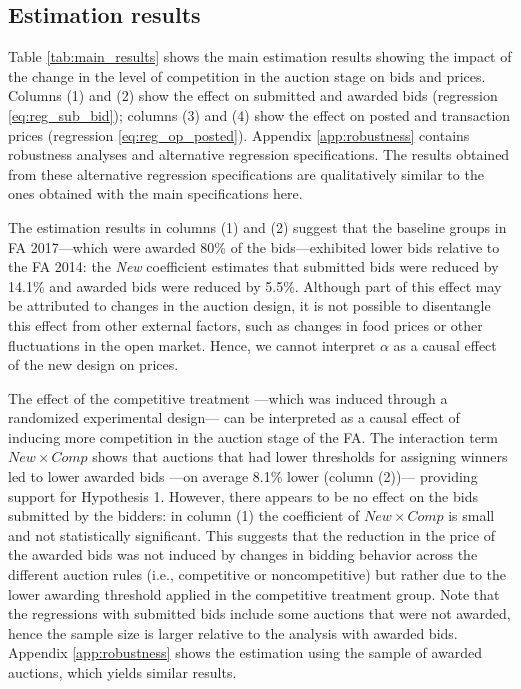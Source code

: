 \subsection{Estimation results}

Table \ref{tab:main_results} shows the main estimation results showing the impact of the change in the level of competition  in the  auction stage on bids and prices. Columns (1) and (2) show the effect on submitted and awarded bids (regression \ref{eq:reg_sub_bid}); columns (3) and (4) show the effect on posted and transaction prices (regression \ref{eq:reg_op_posted}). Appendix \ref{app:robustness} contains robustness analyses and alternative regression specifications. The results obtained from these alternative regression specifications are qualitatively similar to the ones obtained with the main  specifications here.



 The estimation results in columns (1) and (2) suggest that the baseline groups in FA 2017---which were awarded 80\% of the bids---exhibited lower bids relative to the FA 2014: the \textit{New} coefficient estimates that submitted bids were reduced by 14.1\% and awarded bids were reduced by 5.5\%. Although part of this effect may be attributed to changes in the auction design,  it is not possible to disentangle this effect from other external factors, such as changes in food prices or other fluctuations in the open market. Hence, we cannot interpret $\alpha$ as a causal effect of the new design on prices.%
 
 The effect of the competitive treatment ---which was induced through a randomized experimental design--- can be interpreted as a causal effect of inducing more competition in the auction stage of the FA. The interaction term $New\times Comp$ shows that auctions that had lower thresholds for assigning winners led to lower awarded bids ---on average 8.1\% lower (column (2))--- providing support for Hypothesis 1. However, there appears to be no effect on the bids submitted by the bidders: in column (1) the coefficient of $New\times Comp$  is small and not statistically significant. This suggests that the reduction in the price of the awarded bids was not induced by changes in bidding behavior across the different auction rules (i.e., competitive or noncompetitive) but rather due to the lower awarding threshold applied in the competitive treatment group. {Note that the regressions with submitted bids include some auctions that were not awarded, hence the sample size is larger relative to the analysis with awarded bids. Appendix \ref{app:robustness} shows the estimation using the sample of awarded auctions, which yields similar results.}


